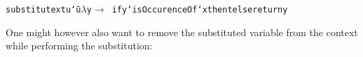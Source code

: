 \documentclass[9pt,authoryear]{sigplanconf}
\begin{document}
{{}\vphantom{$\{$}}\texttt{substitute}\texttt{\mbox{\hspace{0.50em}}}\texttt{x}\texttt{\mbox{\hspace{0.50em}}}\texttt{t}\texttt{\mbox{\hspace{0.50em}}}\texttt{u}\texttt{\mbox{\hspace{0.50em}}}\texttt{{\char `\=}}\texttt{\mbox{\hspace{0.50em}}}\texttt{u}\texttt{\mbox{\hspace{0.50em}}}\texttt{\makebox[1.22ex][c]{\textgreater{}}}\texttt{\mbox{\hspace{0.50em}}}\texttt{$ \lambda $}\texttt{\mbox{\hspace{0.50em}}}\texttt{y}\texttt{\mbox{\hspace{0.50em}}}\texttt{$ \rightarrow $}\texttt{{\nopagebreak \newline%
}\vphantom{$\{$}}\texttt{\mbox{\hspace{0.50em}}}\texttt{\mbox{\hspace{0.50em}}}\texttt{\mbox{\hspace{0.50em}}}\texttt{\mbox{\hspace{0.50em}}}\texttt{\mbox{\hspace{0.50em}}}\texttt{if}\texttt{\mbox{\hspace{0.50em}}}\texttt{y}\texttt{\mbox{\hspace{0.50em}}}\texttt{{`}isOccurenceOf{`}}\texttt{\mbox{\hspace{0.50em}}}\texttt{x}\texttt{\mbox{\hspace{0.50em}}}\texttt{then}\texttt{\mbox{\hspace{0.50em}}}\texttt{t}\texttt{\mbox{\hspace{0.50em}}}\texttt{else}\texttt{\mbox{\hspace{0.50em}}}\texttt{return}\texttt{\mbox{\hspace{0.50em}}}\texttt{y}\texttt{{\nopagebreak \newline%
}\vphantom{$\{$}}%


%
One might however also want to remove the substituted
    variable from the context while performing the substitution{:}%


{\nopagebreak }
\end{document}
